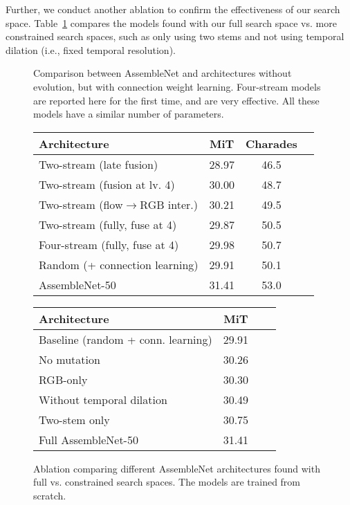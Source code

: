\documentclass{article} \usepackage{iclr2020_conference,times}
\begin{document}
Further, we conduct another ablation to confirm the effectiveness of our search space. Table~\ref{tab:ablation2} compares the models found with our full search space vs. more constrained search spaces, such as only using two stems and not using temporal dilation (i.e., fixed temporal resolution).





\begin{figure}
\begin{minipage}{0.5\textwidth}
    \centering
    \captionsetup{type=table}
    \setlength\tabcolsep{2pt}
    \caption{Comparison between AssembleNet and architectures without evolution, but with connection weight learning. Four-stream models are reported here for the first time, and are very effective. All these models have a similar number of parameters.}
    \label{tab:ablation}
    \begin{tabular}{lccc}
    \toprule
       Architecture & MiT & Charades\\
    \midrule
    Two-stream (late fusion)  & 28.97 & 46.5\\
    Two-stream (fusion at lv. 4) & 30.00 & 48.7\\
    Two-stream (flow$\rightarrow$RGB inter.) & 30.21 & 49.5\\
    Two-stream (fully, fuse at 4) & 29.87 & 50.5\\
Four-stream (fully, fuse at 4) & 29.98 & 50.7\\
    \hline
    Random (+ connection learning) & 29.91 & 50.1\\
    \hline
    AssembleNet-50 & 31.41 & 53.0\\
    \bottomrule
    \end{tabular}
\end{minipage}
\hspace{0.02\textwidth}
\begin{minipage}{0.47\textwidth}
    \centering
    \captionsetup{type=table}
    \setlength\tabcolsep{3pt}
    \caption{Ablation comparing different AssembleNet architectures found with full vs. constrained search spaces. The models are trained from scratch.}
    \label{tab:ablation2}
    \begin{tabular}{lccc}
    \toprule
       Architecture & MiT\\
    \midrule
    Baseline (random + conn. learning) & 29.91\\
    \hline
    No mutation & 30.26\\
    RGB-only & 30.30\\
    Without temporal dilation & 30.49\\
    Two-stem only & 30.75\\
    \hline
    Full AssembleNet-50 & 31.41\\
    \bottomrule
    \end{tabular}
\end{minipage}
\end{figure}
\end{document}
